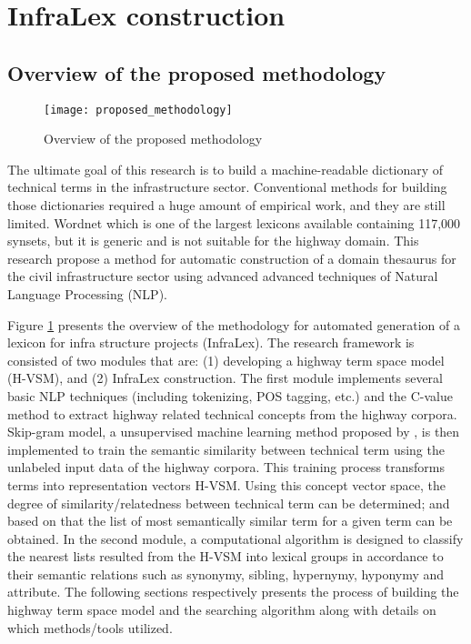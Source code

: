 \documentclass[Journal, InsideFigs, DoubleSpace]{ascelike} %
\begin{document}
\section{InfraLex construction}
\subsection{Overview of the proposed methodology} \label{sec:proposed_method} %
%
\begin{figure}[t]
\centering
\texttt{[image: proposed\_methodology]}
\caption{Overview of the proposed methodology}
\label{fig:framework}
\end{figure}
%
The ultimate goal of this research is to build a machine-readable dictionary of technical terms in the infrastructure sector. Conventional methods for building those dictionaries required a huge amount of empirical work, and they are still limited. Wordnet \cite{miller95} which is one of the largest lexicons available containing 117,000 synsets, but it is generic and is not suitable for the highway domain. This research propose a method for automatic construction of a domain thesaurus for the civil infrastructure sector using advanced advanced techniques of Natural Language Processing (NLP). 
\par
Figure \ref{fig:framework} presents the overview of the methodology for automated generation of a lexicon for infra structure projects (InfraLex). The research framework is consisted of two modules that are: (1) developing a highway term space model (H-VSM), and (2) InfraLex construction. The first module implements several basic NLP techniques (including tokenizing, POS tagging, etc.) and the C-value \cite{frantzi20} method to extract highway related technical concepts from the highway corpora. Skip-gram model, a unsupervised machine learning method proposed by \cite{mikolov13a}, is then implemented to train the semantic similarity between technical term using the unlabeled input data of the highway corpora. This training process transforms terms into representation vectors H-VSM.  Using this concept vector space, the degree of similarity/relatedness between technical term can be determined; and based on that the list of most semantically similar term for a given term can be obtained. In the second module, a computational algorithm is designed to classify  the nearest lists resulted from the H-VSM into lexical groups in accordance to their semantic relations such as synonymy, sibling, hypernymy, hyponymy and attribute. The following sections respectively presents the process of building the highway term space model and the searching algorithm along with details on which methods/tools utilized. 
\end{document}
